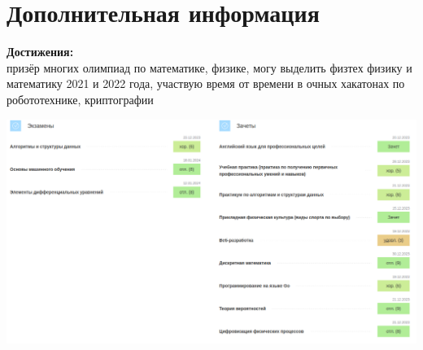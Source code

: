 \documentclass[a4paper,10pt]{article}
\begin{document}
\section*{Дополнительная информация}
\noindent
\textbf{Достижения:} \\ призёр многих олимпиад по математике, физике, могу выделить физтех физику и математику 2021 и 2022 года, участвую время от времени в очных хакатонах по робототехнике, криптографии


\begin{center}
  \includegraphics[scale = 0.5]{pic1.png}
\end{center}
\end{document}
